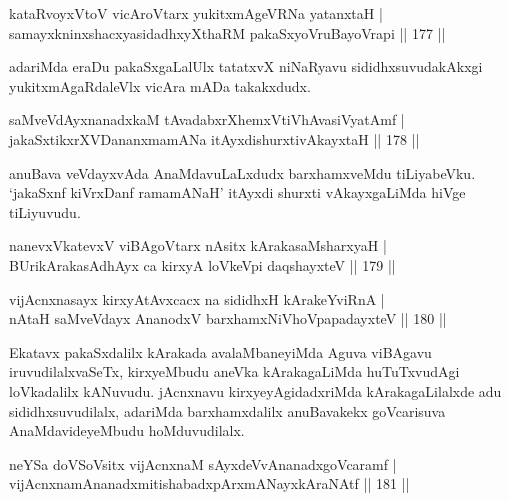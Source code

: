 \begin{shl}
kataRvoyxV\s toV vicAroV\s tarx yukitxmAgeVRNa yatanxtaH |\\
samayxkninxshacxyasidadhxyXthaRM pakaSxyoVruBayoVrapi \hfill || 177 ||
\end{shl}

\begin{artha}
adariMda eraDu pakaSxgaLalUlx tatatxvX niNaRyavu sididhxsuvudakAkxgi yukitxmAgaRdaleVlx vicAra mADa takakxdudx.
\end{artha}

\begin{shl}
saMveVdAyxnanadxkaM tAvadabxrXhemxVtiVhAvasiVyatAmf |\\
jakaSxtikxrXVDananxmamANa itAyxdishurxtivAkayxtaH \hfill || 178 ||
\end{shl}

\begin{artha}
anuBava veVdayxvAda AnaMdavuLaLxdudx barxhamxveMdu tiLiyabeVku. `jakaSxnf kiVrxDanf ramamANaH' itAyxdi shurxti vAkayxgaLiMda hiVge tiLiyuvudu.
\end{artha}


\begin{shl}
nanevxVkatevxV viBAgoV\s tarx nAsitx kArakasaMsharxyaH |\\
BUrikArakasAdhAyx ca kirxyA loVkeV\s pi daqshayxteV \hfill || 179 ||
\end{shl}

\begin{shl}
vijAcnxnasayx kirxyAtAvxcacx na sididhxH kArakeYviRnA |\\
nAtaH saMveVdayx AnanodxV barxhamxNiVhoVpapadayxteV \hfill || 180 ||
\end{shl}

\begin{artha}%
Ekatavx pakaSxdalilx kArakada avalaMbaneyiMda Aguva viBAgavu iruvudilalxvaSeTx, kirxyeMbudu aneVka kArakagaLiMda huTuTxvudAgi loVkadalilx kANuvudu. jAcnxnavu kirxyeyAgidadxriMda kArakagaLilalxde adu sididhxsuvudilalx, adariMda barxhamxdalilx anuBavakekx goVcarisuva AnaMdavideyeMbudu hoMduvudilalx.
\end{artha}


\begin{shl}
neYSa doVSoV\s sitx vijAcnxnaM sAyxdeVvA\s \s nanadxgoVcaramf |\\
vijAcnxnamAnanadxmitishabadxpArxmANayxkAraNAtf \hfill || 181 ||
\end{shl}


